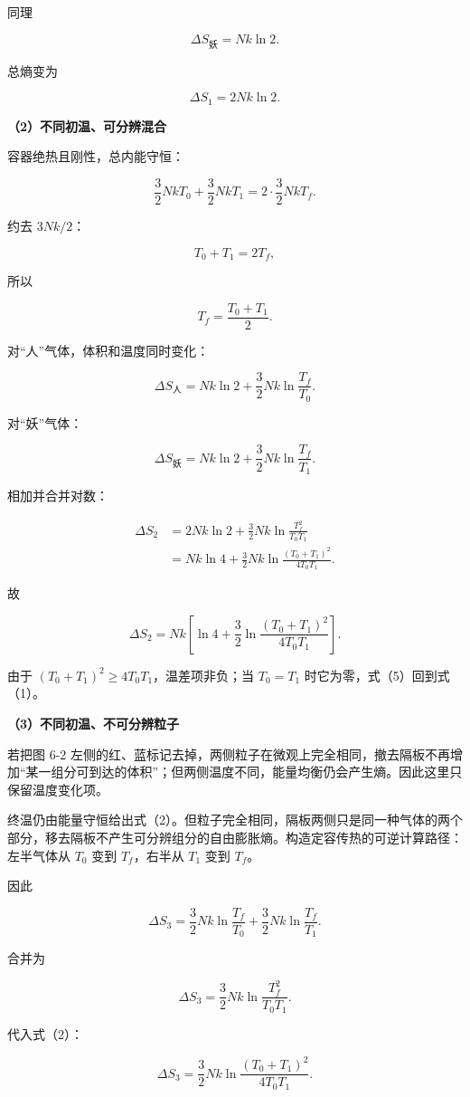 \documentclass[12pt,a4paper,UTF8]{ctexart}
\begin{document}
同理

\[\Delta S_{\text{妖}}=Nk\ln2.\]

总熵变为

\[\boxed{\Delta S_1=2Nk\ln2}.\]

\textbf{（2）不同初温、可分辨混合}

容器绝热且刚性，总内能守恒：

\[\frac32NkT_0+\frac32NkT_1
=2\cdot\frac32NkT_f.\]

约去 \(3Nk/2\)：

\[T_0+T_1=2T_f,\]

所以

\[T_f=\frac{T_0+T_1}{2}.\]

对``人''气体，体积和温度同时变化：

\[\Delta S_{\text{人}}
=Nk\ln2+\frac32Nk\ln\frac{T_f}{T_0}.\]

对``妖''气体：

\[\Delta S_{\text{妖}}
=Nk\ln2+\frac32Nk\ln\frac{T_f}{T_1}.\]

相加并合并对数：

\[\begin{aligned}
\Delta S_2
&=2Nk\ln2+\frac32Nk
\ln\frac{T_f^2}{T_0T_1}\\
&=Nk\ln4+\frac32Nk
\ln\frac{(T_0+T_1)^2}{4T_0T_1}.
\end{aligned}\]

故

\[\boxed{\Delta S_2
=Nk\left[\ln4+\frac32\ln\frac{(T_0+T_1)^2}{4T_0T_1}\right]}.\]

由于 \((T_0+T_1)^2\geq4T_0T_1\)，温差项非负；当 \(T_0=T_1\)
时它为零，式（5）回到式（1）。

\textbf{（3）不同初温、不可分辨粒子}

若把图 6-2
左侧的红、蓝标记去掉，两侧粒子在微观上完全相同，撤去隔板不再增加``某一组分可到达的体积''；但两侧温度不同，能量均衡仍会产生熵。因此这里只保留温度变化项。

终温仍由能量守恒给出式（2）。但粒子完全相同，隔板两侧只是同一种气体的两个部分，移去隔板不产生可分辨组分的自由膨胀熵。构造定容传热的可逆计算路径：左半气体从
\(T_0\) 变到 \(T_f\)，右半从 \(T_1\) 变到 \(T_f\)。

因此

\[\Delta S_3
=\frac32Nk\ln\frac{T_f}{T_0}
+\frac32Nk\ln\frac{T_f}{T_1}.\]

合并为

\[\Delta S_3
=\frac32Nk\ln\frac{T_f^2}{T_0T_1}.\]

代入式（2）：

\[\boxed{\Delta S_3
=\frac32Nk\ln\frac{(T_0+T_1)^2}{4T_0T_1}}.\]
\end{document}
